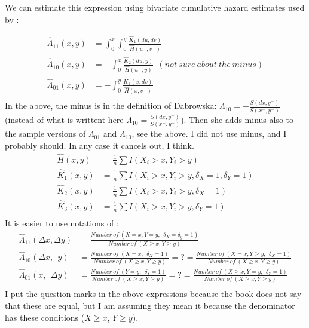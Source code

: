 \documentclass[]{article}
\begin{document}
We can estimate this expression using bivariate cumulative hazard estimates used by \cite{dabrowska1988kaplan}:

	$$
	\begin{aligned}
    \hat{\Lambda}_{11}(x, y) &= \int_0^x \int_0^y \frac{\hat{K}_1(du, dv)}{\hat{H}(u^-, v^-)}\\
    \hat{\Lambda}_{10}(x, y) &= -\int_0^x \frac{\hat{K}_2(du, y)}{\hat{H}(u^-, y)} ~~(not~sure~about~the~minus)\\ 
    \hat{\Lambda}_{01}(x, y) &= -\int_0^y \frac{\hat{K}_3(x, dv)}{\hat{H}(x, v^-)}\\
	\end{aligned}
	$$
  In the above, the minus is in the definition of Dabrowska: $\Lambda_{10} =- \frac{S(dx,y^-)}{S(x^-,y^-)}$ (instead of what is writtent here $\Lambda_{10} = \frac{S(dx,y^-)}{S(x^-,y^-)}$). Then she adds minus also to the sample versions of $\Lambda_{01}$ and $\Lambda_{10}$, see the above. I did not use minus, and I probably should. In any case it cancels out, I think.
	$$
	\begin{aligned}
    \hat{H}(x, y)&= \frac{1}{n}\sum I(X_i > x, Y_i > y)\\
    \hat{K}_1(x, y)&= \frac{1}{n}\sum I(X_i > x, Y_i > y, \delta_X = 1, \delta_Y = 1)\\
    \hat{K}_2(x, y)&= \frac{1}{n}\sum I(X_i > x, Y_i > y, \delta_X = 1)\\
    \hat{K}_3(x, y)&= \frac{1}{n}\sum I(X_i > x, Y_i > y, \delta_Y = 1)\\
	\end{aligned}
	$$
It is easier to use notations of \cite{kalbfleisch2011statistical}:
	$$
	\begin{aligned}
    \hat{\Lambda}_{11}(\Delta x, \Delta y) &= \frac{Number~of~(X=x, Y=y, ~~\delta_X = \delta_y = 1)}{Number~of~(X\geq x, Y\geq y)}\\
    \hat{\Lambda}_{10}(\Delta x, ~~ y) &= \frac{Number~of~(X=x,~~\delta_X = 1)}{Number~of~(X\geq x, Y\geq y)} = ? =\frac{Number~of~(X=x, Y\geq y,~~\delta_X = 1)}{Number~of~(X\geq x, Y\geq y)}\\
    \hat{\Lambda}_{01}(x, ~~ \Delta y) &= \frac{Number~of~(Y=y,~~\delta_Y = 1)}{Number~of~(X\geq x, Y\geq y)} = ? = \frac{Number~of~(X\geq x, Y=y,~~\delta_Y = 1)}{Number~of~(X\geq x, Y\geq y)}\\
	\end{aligned}
	$$
I put the question marks in the above expressions because the book does not say that these are equal, but I am assuming they mean it because the denominator has these conditions ($X\geq x$, $ Y\geq y$).
\end{document}
